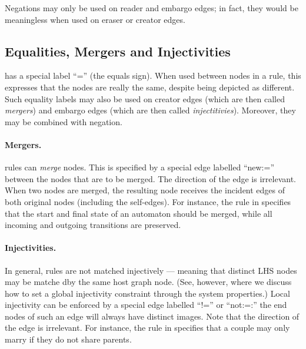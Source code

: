 
Negations may only be used on reader and embargo edges; in fact, they would be
meaningless when used on eraser or creator edges.

\subsection{Equalities, Mergers and Injectivities}

\Groove{} has a special label ``\textsf{=}'' (the equals sign). When used
between nodes in a rule, this expresses that the nodes are really the same,
despite being depicted as different. Such equality labels may also be used on
creator edges (which are then called \emph{mergers}) and embargo edges (which
are then called \emph{injectitivies}). Moreover, they may be combined with
negation.

\paragraph{Mergers.}

\Groove{} rules can \emph{merge} nodes. This is specified by a special edge
labelled ``\textsf{new:=}'' between the nodes that are to be merged. The
direction of the edge is irrelevant. When two nodes are merged, the resulting
node receives the incident edges of both original nodes (including the
self-edges). For instance, the rule in  specifies that the start
and final state of an automaton should be merged, while all incoming and
outgoing transitions are preserved.


\paragraph{Injectivities.}

In general, rules are not matched injectively --- meaning that distinct LHS
nodes may be matche dby the same host graph node. (See, however,
 where we discuss how to set a global injectivity
constraint through the system properties.) Local injectivity can be enforced by
a special edge labelled ``\textsf{!=}'' or ``\textsf{not:=}:'' the end nodes of
such an edge will always have distinct images. Note that the direction of the
edge is irrelevant. For instance, the rule in  specifies that
a couple may only marry if they do not share parents.

